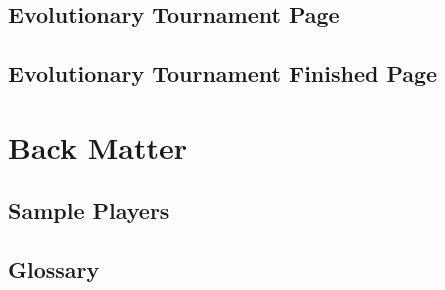 \documentclass[openany]{book}
\begin{document}
\chapter{Evolutionary Tournament Page}


\chapter{Evolutionary Tournament Finished Page}


\part{Back Matter}

\chapter{Sample Players}


\chapter{Glossary}

\end{document}
